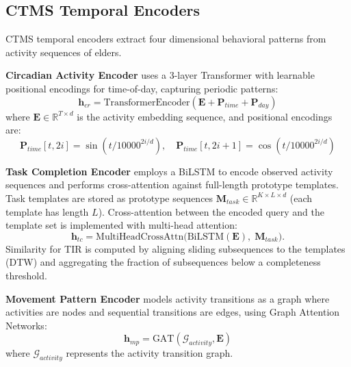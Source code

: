 \documentclass[sigconf, anonymous, 9pt, nonacm]{acmart}
\begin{document}
\subsection{CTMS Temporal Encoders}

CTMS temporal encoders extract four dimensional behavioral patterns from activity sequences of elders.

\noindent\textbf{Circadian Activity Encoder} uses a 3-layer Transformer with learnable positional encodings for time-of-day, capturing periodic patterns:
\begin{equation*}
\mathbf{h}_{cr} = \text{TransformerEncoder}(\mathbf{E} + \mathbf{P}_{time} + \mathbf{P}_{day})
\end{equation*}
where $\mathbf{E} \in \mathbb{R}^{T \times d}$ is the activity embedding sequence, and positional encodings are:
\begin{equation*}
\mathbf{P}_{time}[t, 2i] = \sin(t/10000^{2i/d}), \quad \mathbf{P}_{time}[t, 2i+1] = \cos(t/10000^{2i/d})
\end{equation*}

\noindent\textbf{Task Completion Encoder} employs a BiLSTM to encode observed activity sequences and performs cross-attention against full-length prototype templates. Task templates are stored as prototype sequences
\(\mathbf{M}_{task} \in \mathbb{R}^{K\times L\times d}\) (each template has length $L$). Cross-attention between the encoded query and the template set is implemented with multi-head attention:
\begin{equation*}
\mathbf{h}_{tc} = \text{MultiHeadCrossAttn}\big(\text{BiLSTM}(\mathbf{E}),\;\mathbf{M}_{task}\big).
\end{equation*}
Similarity for TIR is computed by aligning sliding subsequences to the templates (DTW) and aggregating the fraction of subsequences below a completeness threshold.

\noindent\textbf{Movement Pattern Encoder} models activity transitions as a graph where activities are nodes and sequential transitions are edges, using Graph Attention Networks:
\begin{equation*}
\mathbf{h}_{mp} = \text{GAT}(\mathcal{G}_{activity}, \mathbf{E})
\end{equation*}
where $\mathcal{G}_{activity}$ represents the activity transition graph.
\end{document}
